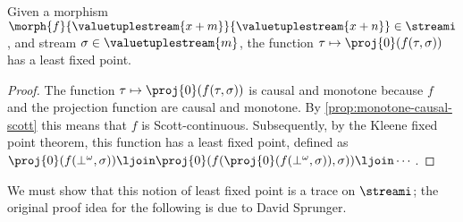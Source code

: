 \begin{lemma}\label{lem:lfp-stream-function}
    Given a morphism \(
    \morph{f}{\valuetuplestream{x+m}}{\valuetuplestream{x+n}}
    \in \streami
    \), and stream \(\sigma \in \valuetuplestream{m}\), the function \(
    \tau \mapsto \proj{0}\mleft(f(\tau,\sigma)\mright)
    \) has a least fixed point.
\end{lemma}
\begin{proof}
    The function \(\tau \mapsto \proj{0}\mleft(f(\tau,\sigma)\mright)\) is
    causal and monotone because \(f\) and the projection function are
    causal and monotone.
    By \cref{prop:monotone-causal-scott} this means that \(f\) is
    Scott-continuous.
    Subsequently, by the Kleene fixed point theorem, this function has a least
    fixed point, defined as \(
    \proj{0}\mleft(f(\bot^\omega, \sigma)\mright) \ljoin
    \proj{0}\mleft(f(\proj{0}\mleft(f(\bot^\omega, \sigma)\mright), \sigma)\mright) \ljoin
    \cdots
    \).
\end{proof}

We must show that this notion of least fixed point is a trace on \(\streami\);
the original proof idea for the following is due to David Sprunger.

